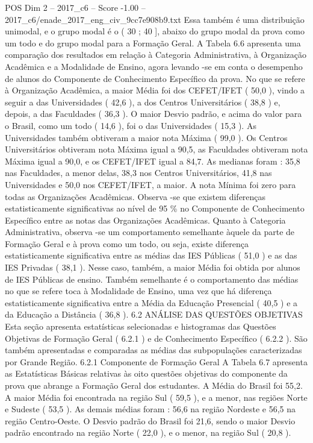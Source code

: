 \begin{textsample}{POS Dim 2 – 2017\_c6 – Score -1.00 – 2017\_c6/enade\_2017\_eng\_civ\_9cc7e908b9.txt}
Essa também é uma distribuição unimodal, e o grupo modal é o ( 30 ; 40 ], abaixo do grupo modal da prova como um todo e do grupo modal para a Formação Geral.
A Tabela 6.6 apresenta uma comparação dos resultados em relação à Categoria Administrativa, à Organização Acadêmica e a Modalidade de Ensino, agora levando -se em conta o desempenho de alunos do Componente de Conhecimento Específico da prova.
No que se refere à Organização Acadêmica, a maior Média foi dos CEFET/IFET ( 50,0 ), vindo a seguir a das Universidades ( 42,6 ), a dos Centros Universitários ( 38,8 ) e, depois, a das Faculdades ( 36,3 ).
O maior Desvio padrão, e acima do valor para o Brasil, como um todo ( 14,6 ), foi o das Universidades ( 15,3 ).
As Universidades também obtiveram a maior nota Máxima ( 99,0 ).
Os Centros Universitários obtiveram nota Máxima igual a 90,5, as Faculdades obtiveram nota Máxima igual a 90,0, e os CEFET/IFET igual a 84,7.
As medianas foram : 35,8 nas Faculdades, a menor delas, 38,3 nos Centros Universitários, 41,8 nas Universidades e 50,0 nos CEFET/IFET, a maior.
A nota Mínima foi zero para todas as Organizações Acadêmicas.
Observa -se que existem diferenças estatisticamente significativas ao nível de 95 \% no Componente de Conhecimento Específico entre as notas das Organizações Acadêmicas.
Quanto à Categoria Administrativa, observa -se um comportamento semelhante àquele da parte de Formação Geral e à prova como um todo, ou seja, existe diferença estatisticamente significativa entre as médias das IES Públicas ( 51,0 ) e as das IES Privadas ( 38,1 ).
Nesse caso, também, a maior Média foi obtida por alunos de IES Públicas de ensino.
Também semelhante é o comportamento das médias no que se refere toca à Modalidade de Ensino, uma vez que há diferença estatisticamente significativa entre a Média da Educação Presencial ( 40,5 ) e a da Educação a Distância ( 36,8 ). 6.2 ANÁLISE DAS QUESTÕES OBJETIVAS Esta seção apresenta estatísticas selecionadas e histogramas das Questões Objetivas de Formação Geral ( 6.2.1 ) e de Conhecimento Específico ( 6.2.2 ).
São também apresentadas e comparadas as médias das subpopulações caracterizadas por Grande Região. 6.2.1 Componente de Formação Geral A Tabela 6.7 apresenta as Estatísticas Básicas relativas às oito questões objetivas do componente da prova que abrange a Formação Geral dos estudantes.
A Média do Brasil foi 55,2.
A maior Média foi encontrada na região Sul ( 59,5 ), e a menor, nas regiões Norte e Sudeste ( 53,5 ).
As demais médias foram : 56,6 na região Nordeste e 56,5 na região Centro-Oeste.
O Desvio padrão do Brasil foi 21,6, sendo o maior Desvio padrão encontrado na região Norte ( 22,0 ), e o menor, na região Sul ( 20,8 ).

\end{textsample}

